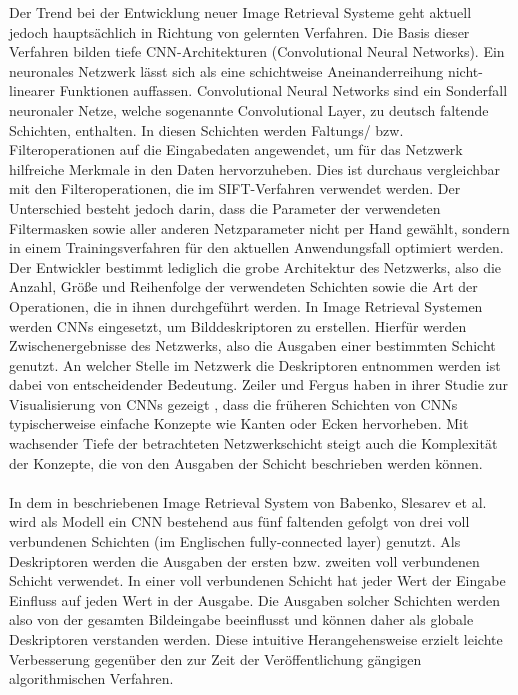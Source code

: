 Der Trend bei der Entwicklung neuer Image Retrieval Systeme geht aktuell jedoch hauptsächlich in Richtung von gelernten Verfahren. Die Basis dieser Verfahren bilden tiefe CNN-Architekturen (Convolutional Neural Networks). Ein neuronales Netzwerk lässt sich als eine schichtweise Aneinanderreihung nicht-linearer Funktionen auffassen. Convolutional Neural Networks sind ein Sonderfall neuronaler Netze, welche sogenannte Convolutional Layer, zu deutsch faltende Schichten, enthalten. In diesen Schichten werden Faltungs/ bzw. Filteroperationen auf die Eingabedaten angewendet, um für das Netzwerk hilfreiche Merkmale in den Daten hervorzuheben. Dies ist durchaus vergleichbar mit den Filteroperationen, die im SIFT-Verfahren verwendet werden. Der Unterschied besteht jedoch darin, dass die Parameter der verwendeten Filtermasken sowie aller anderen Netzparameter nicht per Hand gewählt, sondern in einem Trainingsverfahren für den aktuellen Anwendungsfall optimiert werden. Der Entwickler bestimmt lediglich die grobe Architektur des Netzwerks, also die Anzahl, Größe und Reihenfolge der verwendeten Schichten sowie die Art der Operationen, die in ihnen durchgeführt werden. In Image Retrieval Systemen werden CNNs eingesetzt, um Bilddeskriptoren zu erstellen. Hierfür werden Zwischenergebnisse des Netzwerks, also die Ausgaben einer bestimmten Schicht genutzt. An welcher Stelle im Netzwerk die Deskriptoren entnommen werden ist dabei von entscheidender Bedeutung. Zeiler und Fergus haben in ihrer Studie zur Visualisierung von CNNs gezeigt \cite{extraction_point_meaning}, dass die früheren Schichten von CNNs typischerweise einfache Konzepte wie Kanten oder Ecken hervorheben. Mit wachsender Tiefe der betrachteten Netzwerkschicht steigt auch die Komplexität der Konzepte, die von den Ausgaben der Schicht beschrieben werden können.
\\\\
In dem in \cite{fc_extraction_neural_codes} beschriebenen Image Retrieval System von Babenko, Slesarev et al. wird als Modell ein CNN bestehend aus fünf faltenden gefolgt von drei voll verbundenen Schichten (im Englischen fully-connected layer) genutzt. Als Deskriptoren werden die Ausgaben der ersten bzw. zweiten voll verbundenen Schicht verwendet. In einer voll verbundenen Schicht hat jeder Wert der Eingabe Einfluss auf jeden Wert in der Ausgabe. Die Ausgaben solcher Schichten werden also von der gesamten Bildeingabe beeinflusst und können daher als globale Deskriptoren verstanden werden. Diese intuitive Herangehensweise erzielt leichte Verbesserung gegenüber den zur Zeit der Veröffentlichung gängigen algorithmischen Verfahren.
